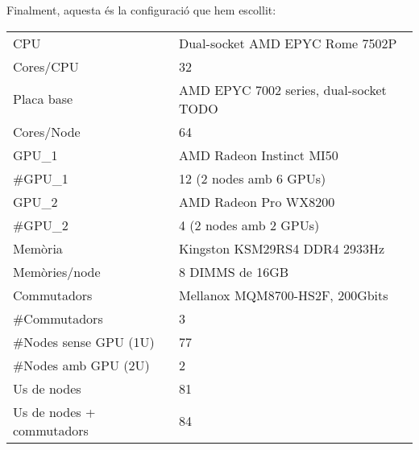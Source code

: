 \clearpage

Finalment, aquesta és la configuració que hem escollit:
\begin{table}[H]
\begin{adjustwidth}{-1.0in}{-1.0in}
\begin{center}
\begin{tabular}{l|l}
\hline
    {\cellcolor[HTML]{EFEFEF}CPU}         & {\cellcolor[HTML]{EFEFEF}Dual-socket AMD EPYC Rome 7502P \cite{cpu_amd_7502_buy}} \\ 
    Cores/CPU & 32 \\
    \rowcolor[HTML]{EFEFEF}
    Placa base & AMD EPYC 7002 series, dual-socket \cite{} TODO \\
Cores/Node                                       & 64                                             \\ 
    {\cellcolor[HTML]{EFEFEF}GPU\_1}                       & {\cellcolor[HTML]{EFEFEF}AMD Radeon Instinct MI50 \cite{gpu_mi50}} \\ 
\#GPU\_1                                           & 12 (2 nodes amb 6 GPUs)                         \\
    {\cellcolor[HTML]{EFEFEF}GPU\_2}                       & {\cellcolor[HTML]{EFEFEF}AMD Radeon Pro WX8200 \cite{gpu_pro_8200}} \\ 
\#GPU\_2                                           & 4 (2 nodes amb 2 GPUs)                         \\
    {\cellcolor[HTML]{EFEFEF}Memòria}     & {\cellcolor[HTML]{EFEFEF}Kingston KSM29RS4 DDR4 2933Hz \cite{mem2}}   \\
{\color[HTML]{000000}Memòries/node}             & {\color[HTML]{000000}8 DIMMS de 16GB}          \\ 
    {\cellcolor[HTML]{EFEFEF}Commutadors} & {\cellcolor[HTML]{EFEFEF}Mellanox MQM8700-HS2F, 200Gbits \cite{mellanox_mqm8700-hs2f}} \\ 
{\color[HTML]{000000}\#Commutadors}             & {\color[HTML]{000000}3}                        \\ 
{\cellcolor[HTML]{EFEFEF}\#Nodes sense GPU (1U)}    & {\cellcolor[HTML]{EFEFEF}77}                       \\
{\color[HTML]{000000}\#Nodes amb GPU (2U)}      & {\color[HTML]{000000}2}                        \\
{\cellcolor[HTML]{EFEFEF}Us de nodes}               & {\cellcolor[HTML]{EFEFEF}81}                       \\
{\color[HTML]{000000}Us de nodes + commutadors} & {\color[HTML]{000000}84}                       \\ \hline

\end{tabular}
\end{center}
\end{adjustwidth}
\end{table}
